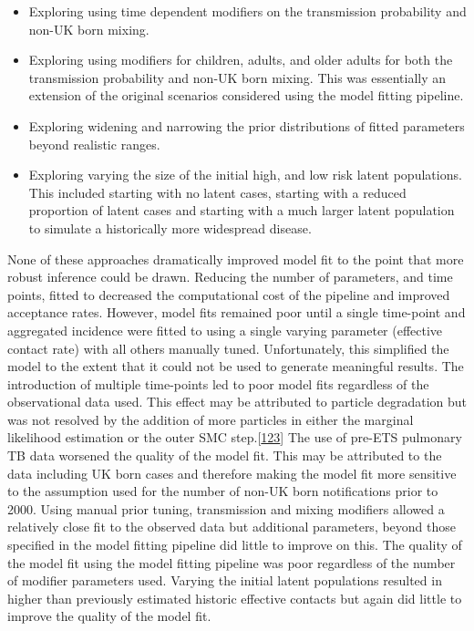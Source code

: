 \documentclass[11pt,twoside]{bristolthesis}
\begin{document}
\begin{itemize}
  \item
    Exploring using time dependent modifiers on the transmission probability and non-UK born mixing.
  \item
    Exploring using modifiers for children, adults, and older adults for both the transmission probability and non-UK born mixing. This was essentially an extension of the original scenarios considered using the model fitting pipeline.
  \item
    Exploring widening and narrowing the prior distributions of fitted parameters beyond realistic ranges.
  \item
    Exploring varying the size of the initial high, and low risk latent populations. This included starting with no latent cases, starting with a reduced proportion of latent cases and starting with a much larger latent population to simulate a historically more widespread disease.
  \end{itemize}
  None of these approaches dramatically improved model fit to the point that more robust inference could be drawn. Reducing the number of parameters, and time points, fitted to decreased the computational cost of the pipeline and improved acceptance rates. However, model fits remained poor until a single time-point and aggregated incidence were fitted to using a single varying parameter (effective contact rate) with all others manually tuned. Unfortunately, this simplified the model to the extent that it could not be used to generate meaningful results. The introduction of multiple time-points led to poor model fits regardless of the observational data used. This effect may be attributed to particle degradation but was not resolved by the addition of more particles in either the marginal likelihood estimation or the outer SMC step.{[}\protect\hyperlink{ref-Murray2015}{123}{]} The use of pre-ETS pulmonary TB data worsened the quality of the model fit. This may be attributed to the data including UK born cases and therefore making the model fit more sensitive to the assumption used for the number of non-UK born notifications prior to 2000. Using manual prior tuning, transmission and mixing modifiers allowed a relatively close fit to the observed data but additional parameters, beyond those specified in the model fitting pipeline did little to improve on this. The quality of the model fit using the model fitting pipeline was poor regardless of the number of modifier parameters used. Varying the initial latent populations resulted in higher than previously estimated historic effective contacts but again did little to improve the quality of the model fit.
  
\end{document}
